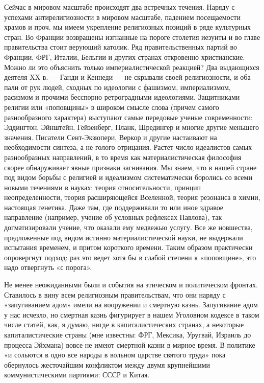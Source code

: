 Сейчас в мировом масштабе происходят два встречных течения. Наряду с успехами
антирелигиозности в мировом масштабе, падением посещаемости храмов и проч. мы
имеем укрепление религиозных позиций в ряде культурных стран. Во Франции
возвращены изгнанные на пороге столетия иезуиты и во главе правительства стоит
верующий католик. Ряд правительственных партий во Франции, ФРГ, Италии, Бельгии
и других странах откровенно христианские. Можно ли это объяснить только
империалистической реакцией? Два выдающихся деятеля XX в. --- Ганди и Кеннеди ---
не скрывали своей религиозности, и оба пали от рук людей, сходных по идеологии
с фашизмом, империализмом, расизмом и прочими бесспорно ретроградными
идеологиями. Защитниками религии или «поповщины» в широком смысле слова (причем
самого разнообразного характера) выступают самые передовые ученые
современности: Эддингтон, Эйнштейн, Гейзенберг, Планк, Шредингер и многие
другие меньшего значения. Писатели Сент-Экзюпери, Веркор и другие настаивают на
необходимости синтеза, а не голого отрицания. Растет число идеалистов самых
разнообразных направлений, в то время как материалистическая философия скорее
обнаруживает явные признаки загнивания. Мы знаем, что в нашей стране под видом
борьбы с религией и идеализмом систематически боролись со всеми новыми
течениями в науках: теория относительности, принцип неопределенности, теория
расширяющейся Вселенной, теория резонанса в химии, настоящая генетика. Даже
там, где поддерживали то или иное здравое направление (например, учение об
условных рефлексах Павлова), так догматизировали учение, что оказали ему
медвежью услугу. Все же новшества, предложенные под видом истинно
материалистической науки, не выдержали испытания временем, и притом короткого
времени. Таким образом практически опровергнут подход: раз это ведет хотя бы в
слабой степени к «поповщине», это надо отвергнуть «с порога».

Не менее неожиданными были и события на этическом и политическом фронтах.
Ставилось в вину всем религиозным правительствам, что они наряду с
«запугиванием адом» имели на вооружении и смертную
казнь. Запугивание адом у нас исчезло, но смертная казнь фигурирует в нашем
Уголовном кодексе в таком числе статей, как, я думаю, нигде в капиталистических
странах, а некоторые капиталистические страны (мне известны: ФРГ, Мексика,
Уругвай, Израиль до процесса Эйхмана) вовсе не имеют смертной казни в мирное
время. В политике «и сольются в одно все народы в вольном царстве святого
труда» пока обернулось жесточайшим конфликтом между двумя крупнейшими
коммунистическими партиями: СССР и Китая.

